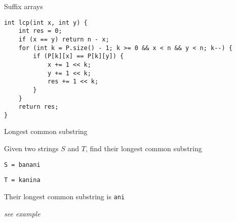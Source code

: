 \begin{frame}[fragile]{Suffix arrays}
    \begin{verbatim}
int lcp(int x, int y) {
    int res = 0;
    if (x == y) return n - x;
    for (int k = P.size() - 1; k >= 0 && x < n && y < n; k--) {
        if (P[k][x] == P[k][y]) {
            x += 1 << k;
            y += 1 << k;
            res += 1 << k;
        }
    }
    return res;
}
\end{verbatim}
\end{frame}

\begin{frame}{Longest common substring}
    \bi
        \item Given two strings $S$ and $T$, find their longest common substring
            \vspace{10pt}
        \item \texttt{S = banani}
        \item \texttt{T = kanina}
            \vspace{10pt}
        \item Their longest common substring is \texttt{ani}
            \vspace{20pt}
        \item \textit{see example}
    \ei
\end{frame}



